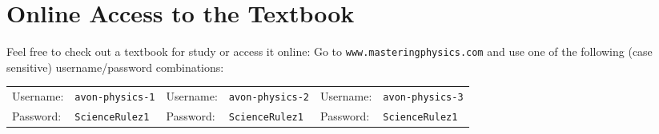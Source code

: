 \documentclass[10pt]{exam}
\begin{document}
\section*{Online Access to the Textbook}

Feel free to check out a textbook for study or access it online:  Go to \texttt{www.masteringphysics.com} and use one of the following (case sensitive) username/password combinations:

\vspace{1em}

\begin{tabular}{lp{8em}|lp{8em}|lp{8em}}
  Username: & \texttt{avon-physics-1} &
  Username: & \texttt{avon-physics-2} &
  Username: & \texttt{avon-physics-3} \\
  Password: & \texttt{ScienceRulez1}  &
  Password: & \texttt{ScienceRulez1}  &
  Password: & \texttt{ScienceRulez1} 
\end{tabular}
\end{document}
